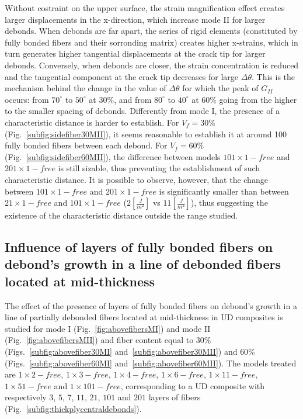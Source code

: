 \documentclass[review]{elsarticle}
\begin{document}
Without costraint on the upper surface, the strain magnification effect creates larger displacements in the x-direction, which increase mode II for larger debonds. When debonds are far apart, the series of rigid elements (constituted by fully bonded fibers and their sorronding matrix) creates higher x-strains, which in turn generates higher tangential displacements at the crack tip for larger debonds. Conversely, when debonds are closer, the strain concentration is reduced and the tangential component at the crack tip decreases for large $\Delta\theta$. This is the mechanism behind the change in the value of $\Delta\theta$ for which the peak of $G_{II}$ occurs: from $70^{\circ}$ to $50^{\circ}$ at $30\%$, and from $80^{\circ}$ to $40^{\circ}$ at $60\%$ going from the higher to the smaller spacing of debonds. Differently from mode I, the presence of a characteristic distance is harder to establish. For $V_{f}=30\%$ (Fig.~\ref{subfig:sidefiber30MII}), it seems reasonable to establish it at around 100 fully bonded fibers between each debond. For $V_{f}=60\%$ (Fig.~\ref{subfig:sidefiber60MII}), the difference between models $101\times 1-free$ and $201\times 1-free$ is still sizable, thus preventing the establishment of such characteristic distance. It is possible to observe, however, that the change between $101\times 1-free$ and $201\times 1-free$ is significantly smaller than between $21\times 1-free$ and $101\times 1-free$ ($2\left[\frac{J}{m^{2}}\right]$ vs $11\left[\frac{J}{m^{2}}\right]$), thus suggesting the existence of the characteristic distance outside the range studied.

\subsection{Influence of layers of fully bonded fibers on debond's growth in a line of debonded fibers located at mid-thickness}

The effect of the presence of layers of fully bonded fibers on debond's growth in a line of partially debonded fibers located at mid-thickness in UD composites is studied for mode I (Fig.~\ref{fig:abovefibersMI}) and mode II (Fig.~\ref{fig:abovefibersMII}) and fiber content equal to $30\%$ (Figs.~\ref{subfig:abovefiber30MI} and~\ref{subfig:abovefiber30MII}) and $60\%$ (Figs.~\ref{subfig:abovefiber60MI} and~\ref{subfig:abovefiber60MII}). The models treated are $1\times2-free$, $1\times3-free$, $1\times4-free$, $1\times6-free$, $1\times11-free$, $1\times51-free$ and $1\times101-free$, corresponding to a UD composite with respectively $3$, $5$, $7$, $11$, $21$, $101$ and $201$ layers of fibers (Fig.~\ref{subfig:thickplycentraldebonds}).
\end{document}
